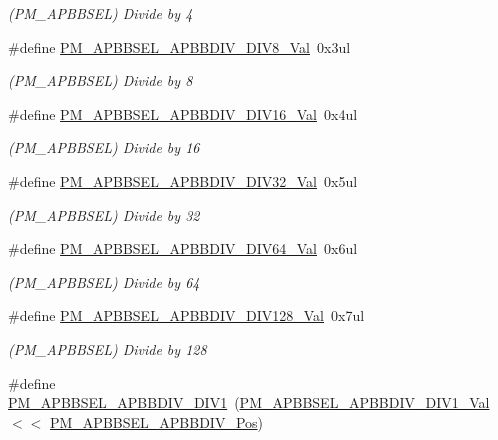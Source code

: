 \begin{DoxyCompactItemize}
\begin{DoxyCompactList}\small\item\em (P\+M\+\_\+\+A\+P\+B\+B\+S\+EL) Divide by 4 \end{DoxyCompactList}\item 
\#define \mbox{\hyperlink{group___s_a_m_d21___p_m_gaa699336852d207d8af640baa1c917e71}{P\+M\+\_\+\+A\+P\+B\+B\+S\+E\+L\+\_\+\+A\+P\+B\+B\+D\+I\+V\+\_\+\+D\+I\+V8\+\_\+\+Val}}~0x3ul
\begin{DoxyCompactList}\small\item\em (P\+M\+\_\+\+A\+P\+B\+B\+S\+EL) Divide by 8 \end{DoxyCompactList}\item 
\#define \mbox{\hyperlink{group___s_a_m_d21___p_m_ga492f869fae35e226de8cc85165f51785}{P\+M\+\_\+\+A\+P\+B\+B\+S\+E\+L\+\_\+\+A\+P\+B\+B\+D\+I\+V\+\_\+\+D\+I\+V16\+\_\+\+Val}}~0x4ul
\begin{DoxyCompactList}\small\item\em (P\+M\+\_\+\+A\+P\+B\+B\+S\+EL) Divide by 16 \end{DoxyCompactList}\item 
\#define \mbox{\hyperlink{group___s_a_m_d21___p_m_ga68ab60cf10293d64c782ab374f7ab72a}{P\+M\+\_\+\+A\+P\+B\+B\+S\+E\+L\+\_\+\+A\+P\+B\+B\+D\+I\+V\+\_\+\+D\+I\+V32\+\_\+\+Val}}~0x5ul
\begin{DoxyCompactList}\small\item\em (P\+M\+\_\+\+A\+P\+B\+B\+S\+EL) Divide by 32 \end{DoxyCompactList}\item 
\#define \mbox{\hyperlink{group___s_a_m_d21___p_m_ga2f3fd93521a232a039f3d891efed5b0f}{P\+M\+\_\+\+A\+P\+B\+B\+S\+E\+L\+\_\+\+A\+P\+B\+B\+D\+I\+V\+\_\+\+D\+I\+V64\+\_\+\+Val}}~0x6ul
\begin{DoxyCompactList}\small\item\em (P\+M\+\_\+\+A\+P\+B\+B\+S\+EL) Divide by 64 \end{DoxyCompactList}\item 
\#define \mbox{\hyperlink{group___s_a_m_d21___p_m_ga7b5c5d49588ec48addaf4b6e23937865}{P\+M\+\_\+\+A\+P\+B\+B\+S\+E\+L\+\_\+\+A\+P\+B\+B\+D\+I\+V\+\_\+\+D\+I\+V128\+\_\+\+Val}}~0x7ul
\begin{DoxyCompactList}\small\item\em (P\+M\+\_\+\+A\+P\+B\+B\+S\+EL) Divide by 128 \end{DoxyCompactList}\item 
\#define \mbox{\hyperlink{group___s_a_m_d21___p_m_ga44965893f5e660eb75bc381de68c39de}{P\+M\+\_\+\+A\+P\+B\+B\+S\+E\+L\+\_\+\+A\+P\+B\+B\+D\+I\+V\+\_\+\+D\+I\+V1}}~(\mbox{\hyperlink{group___s_a_m_d21___p_m_gabbcc76aa37209416de7d817aba658aa7}{P\+M\+\_\+\+A\+P\+B\+B\+S\+E\+L\+\_\+\+A\+P\+B\+B\+D\+I\+V\+\_\+\+D\+I\+V1\+\_\+\+Val}}   $<$$<$ \mbox{\hyperlink{group___s_a_m_d21___p_m_ga96e9f272a436f893bd20fbdf05644b79}{P\+M\+\_\+\+A\+P\+B\+B\+S\+E\+L\+\_\+\+A\+P\+B\+B\+D\+I\+V\+\_\+\+Pos}})
$$
\end{DoxyCompactItemize}
